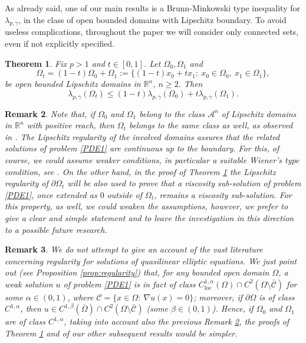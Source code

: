 \documentclass[12pt]{amsart}
\newtheorem{theorem}{Theorem}[section]
\newtheorem{remark}[theorem]{Remark}
\newcommand{\R}{\mathbb R}
\newcommand{\1}{\mathbf 1}
\newcommand{\C}{\mathcal C}
\begin{document}
\medskip

As already said, one of our main results is a Brunn-Minkowski type inequality for $\lambda_{p,\gamma}$, in the class of open bounded domains with Lipschitz boundary. {   To avoid useless complications, throughout the paper we will consider only connected sets, even if not explicitly specified.}
\begin{theorem}\label{T1}
Fix $p>1$ and $t\in[0,1]$. Let $\Omega_0,\Omega_1$  and
\[
\Omega_t=(1-t)\Omega_0+\Omega_1:=\{(1-t)x_0+tx_1:\ x_0\in \Omega_0,\ x_1\in \Omega_1 \},
\]
be open bounded Lipschitz domains in $\R^n$, $n\geq 2$.
Then
\[
\lambda_{p,\gamma}(\Omega_t)\leq (1-t)\lambda_{p,\gamma}(\Omega_0)+t\lambda_{p,\gamma}(\Omega_1).
\]
\end{theorem}
\begin{remark}\label{rem:Lip}
Note that, if $\Omega_0$ and $\Omega_1$ belong to the class $\mathcal{A}^n$ of Lipschitz domains in $\R^n$ with positive reach, then $\Omega_t$ belongs to the same class as well, as observed in \cite{Crasta-Fragal2020}. The Lipschitz regularity of the involved domains assures that the related solutions of problem \eqref{PDE1} are continuous up to the boundary. For this, of course, we could assume weaker conditions, in particular a suitable Wiener's type condition, see \cite{GariepyZiemer}.  On the other hand, in the proof of Theorem \ref{T1} the Lipschitz regularity of $\partial\Omega_t$ will be also used to prove that a viscosity sub-solution of problem \eqref{PDE1}, once extended as $0$ outside of $\Omega_t$, remains a viscosity sub-solution. For this property, as well, we could weaken the assumptions,
however, we prefer to give a clear and simple statement and to leave the investigation in this direction to a possible future research.
\end{remark}
\begin{remark}
We do not attempt to give an account of the vast literature concerning regularity for solutions of quasilinear elliptic equations.
We just point out (see Proposition \ref{prop:regularity}) that, for any bounded open domain $\Omega$, a weak solution $u$ of problem \eqref{PDE1} is in fact of class $C^{1,\alpha}_{\mathrm{loc}}(\Omega)\cap C^2(\Omega \setminus \bar{\C})$ for some $\alpha \in (0,1)$, where $\C=\{x\in \Omega:\ \nabla u(x)=0 \}$;
moreover, if $\partial\Omega$ is of class $C^{1,\alpha}$, then  $u\in C^{1,\beta}(\overline{\Omega})\cap C^2(\Omega \setminus \bar{\C})$ (some $\beta\in (0,1)$). Hence, if $\Omega_0$ and $\Omega_1$ are of class $C^{1,\alpha}$, taking into account also the previous Remark \ref{rem:Lip}, the proofs of Theorem \ref{T1} and of our other subsequent results would be simpler.
\end{remark}
\end{document}
